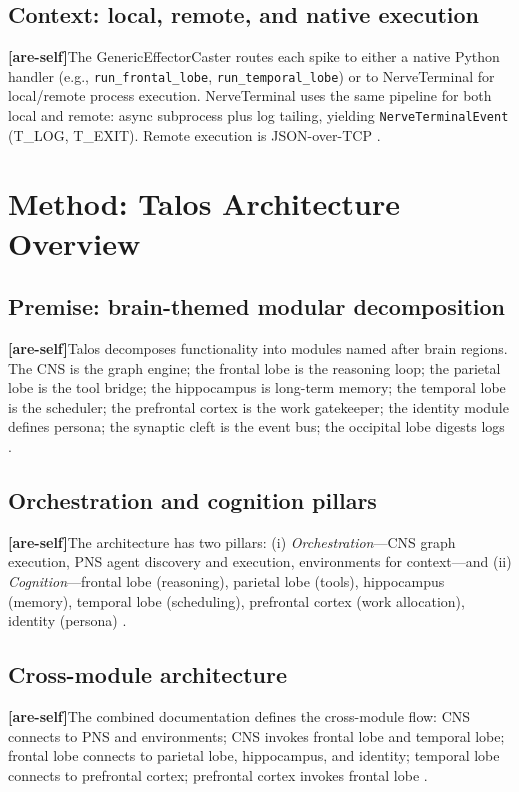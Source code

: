 \documentclass[11pt]{article}
\newcommand{\areself}{\textbf{[are-self]}}
\begin{document}
	\subsection{Context: local, remote, and native execution}
	\areself The GenericEffectorCaster routes each spike to either a native Python handler (e.g., \texttt{run\_frontal\_lobe}, \texttt{run\_temporal\_lobe}) or to NerveTerminal for local/remote process execution. NerveTerminal uses the same pipeline for both local and remote: async subprocess plus log tailing, yielding \texttt{NerveTerminalEvent} (T\_LOG, T\_EXIT). Remote execution is JSON-over-TCP \cite{talosPNS,talosLiveCodebase}.
	
	\section{Method: Talos Architecture Overview}
	\label{are-self:method-overview}
	\subsection{Premise: brain-themed modular decomposition}
	\areself Talos decomposes functionality into modules named after brain regions. The CNS is the graph engine; the frontal lobe is the reasoning loop; the parietal lobe is the tool bridge; the hippocampus is long-term memory; the temporal lobe is the scheduler; the prefrontal cortex is the work gatekeeper; the identity module defines persona; the synaptic cleft is the event bus; the occipital lobe digests logs \cite{talosCombined,talosLiveCodebase}.
	
	\subsection{Orchestration and cognition pillars}
	\areself The architecture has two pillars: (i) \emph{Orchestration}---CNS graph execution, PNS agent discovery and execution, environments for context---and (ii) \emph{Cognition}---frontal lobe (reasoning), parietal lobe (tools), hippocampus (memory), temporal lobe (scheduling), prefrontal cortex (work allocation), identity (persona) \cite{talosCombined}.
	
	\subsection{Cross-module architecture}
	\areself The combined documentation defines the cross-module flow: CNS connects to PNS and environments; CNS invokes frontal lobe and temporal lobe; frontal lobe connects to parietal lobe, hippocampus, and identity; temporal lobe connects to prefrontal cortex; prefrontal cortex invokes frontal lobe \cite{talosCombined}.
	
\end{document}
